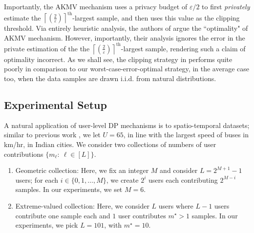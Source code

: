 \documentclass[conference,letterpaper]{IEEEtran}
\theoremstyle{remark}
\theoremstyle{definition}
\begin{document}
Importantly, the AKMV mechanism uses a privacy budget of $\varepsilon/2$ to first \emph{privately} estimate the $\left \lceil \left(\frac{2}{\varepsilon}\right)\right \rceil^{\text{th}}$-largest sample, and then uses this value as the clipping threshold. Via entirely heuristic analysis, the authors of \cite{amin} argue the ``optimality" of AKMV mechanism. However, importantly, their analysis ignores the error in the private estimation of the the $\left \lceil \left(\frac{2}{\varepsilon}\right)\right \rceil^{\text{th}}$-largest sample, rendering such a claim of optimality incorrect. As we shall see, the clipping strategy in \cite[Sec. 3]{amin} performs quite poorly in comparison to our worst-case-error-optimal strategy, in the average case too, when the data samples are drawn i.i.d. from natural distributions.

\subsection{Experimental Setup}
\label{sec:exp-setup}
A natural application of user-level DP mechanisms is to spatio-temporal datasets; similar to previous work \cite{dp_spcom,dp_preprint}, we let $U = 65$, in line with the largest speed of buses in km/hr, in Indian cities. We consider two collections of numbers of user contributions $\{m_\ell:\ \ell\in [L]\}$. 
\begin{enumerate}
	\item Geometric collection: Here, we fix an integer $M$ and consider $L = 2^{M+1}-1$ users; for each $i\in \{0,1,\ldots,M\}$, we create $2^i$ users each contributing $2^{M-i}$ samples. 
	In our experiments, we set $M = 6$.
	\item Extreme-valued collection: Here, we consider $L$ users where $L-1$ users contribute one sample each and $1$ user contributes $m^\star>1$ samples. %
	In our experiments, we pick $L = 101$, with $m^\star = 10$.
\end{enumerate}
\end{document}
